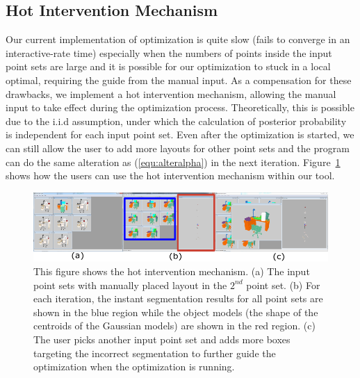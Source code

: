 \subsection{Hot Intervention Mechanism}
%
Our current implementation of optimization is quite slow (fails to converge in an interactive-rate time) especially when the numbers of points inside the input point sets are large and it is possible for our optimization to stuck in a local optimal, requiring the guide from the manual input. 
%
As a compensation for these drawbacks, we implement a hot intervention mechanism, allowing the manual input to take effect during the optimization process. 
Theoretically, this is possible due to the i.i.d assumption, under which the calculation of posterior probability is independent for each input point set. 
%
Even after the optimization is started, we can still allow the user to add more layouts  for other point sets and the program can do the same alteration as (\ref{equ:alteralpha}) in the next iteration. 
%
Figure~\ref{fig:hi} shows how the users can use the hot intervention mechanism within our tool.
%
\begin{figure}[htb]
	\centering
	\includegraphics[width=\linewidth]{images/hotintervention/hi}
	\caption{\label{fig:hi} This figure shows the hot intervention mechanism. (a) The input point sets with manually placed layout in the $2^{nd}$ point set. (b) For each iteration, the instant segmentation results for all point sets are shown in the blue region while the object models (the shape of the centroids of the Gaussian models) are shown in the red region. (c) The user picks another input point set and adds more boxes targeting the incorrect segmentation to further guide the optimization when the optimization is running. }
\end{figure}